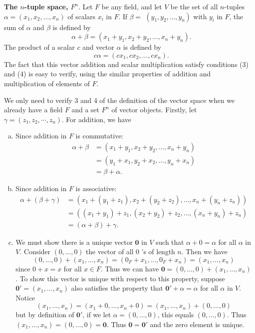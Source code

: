 \documentclass[main.tex]{subfiles}
\begin{document}
\begin{example}\label{n-tuple_space}
\textbf{The $n$-tuple space, $F^n$}. Let $F$ be any field, and let $V$ be the set of all $n$-tuples $\alpha=\left(x_1, x_2, \ldots, x_n\right)$ of scalars $x_i$ in $F$. If $\beta=$ $\left(y_1, y_2, \ldots, y_n\right)$ with $y_i$ in $F$, the sum of $\alpha$ and $\beta$ is defined by
$$\quad \alpha+\beta=\left(x_1+y_1, x_2+y_2, \ldots, x_n+y_n\right).$$
The product of a scalar $c$ and vector $\alpha$ is defined by
$$\quad c \alpha=\left(c x_1, c x_2, \ldots, c x_n\right).$$
The fact that this vector addition and scalar multiplication satisfy conditions (3) and (4) is easy to verify, using the similar properties of addition and multiplication of elements of $F$.
\end{example}
\begin{verification}
    We only need to verify 3 and 4 of the definition of the vector space when we already have a field $F$ and a set $F^n$ of vector objects. Firstly, let $\gamma = (z_1, z_2, \cdots, z_n)$. For addition, we have 
    \begin{enumerate}[(a)]
        \item Since addition in $F$ is commutative: \begin{align*}\alpha+\beta &=\left(x_1+y_1, x_2+y_2, \ldots, x_n+y_n\right)\\
        &=\left(y_1+x_1,y_2+x_2, \ldots, y_n+x_n\right)\\
        &=\beta + \alpha.\end{align*}
        \item Since addition in $F$ is associative:  \begin{align*}\alpha+(\beta+\gamma) &=\left(x_1+(y_1+z_1), x_2+(y_2+z_2), \ldots, x_n+(y_n+z_n)\right)\\
        &=\left((x_1+y_1)+z_1, (x_2+y_2)+z_2, \ldots, (x_n+y_n)+z_n\right)\\
        &=(\alpha+\beta)+\gamma.\end{align*}
        
        \item We must show there is a unique vector $\mathbf{0}$ in $V$ such that $\alpha+0=\alpha$ for all $\alpha$ in $V$. Consider $\left(0, \ldots, 0\right)$ the vector of all 0 's of length $n$. Then we have
        $$
        \left(0, \ldots, 0\right)+\left(x_1, \ldots, x_n\right)=\left(0_F+x_1, \ldots, 0_F+x_n\right)=\left(x_1, \ldots, x_n\right)
        $$
        since $0+x=x$ for all $x \in F$. Thus we can have $\mathbf{0} =  \left(0, \ldots, 0\right)+\left(x_1, \ldots, x_n\right)$. To show this vector is unique with respect to this property, suppose $\mathbf{0}'=\left(x_1, \ldots, x_n\right)$ also satisfies the property that $\mathbf{0}'+\alpha=\alpha$ for all $\alpha$ in $V$. Notice
        $$
        \left(x_1, \ldots, x_n\right)=\left(x_1+0, \ldots, x_n+0\right)=\left(x_1, \ldots, x_n\right)+\left(0, \ldots, 0\right)
        $$
        but by definition of $\mathbf{0}'$, if we let $\alpha=\left(0, \ldots, 0\right)$, this equals $\left(0, \ldots, 0\right)$. Thus $\left(x_1, \ldots, x_n\right)=\left(0, \ldots, 0\right) = \mathbf{0}$. Thus $\mathbf{0}=\mathbf{0}'$ and the zero element is unique.
    \end{enumerate}
\end{verification}
\end{document}
